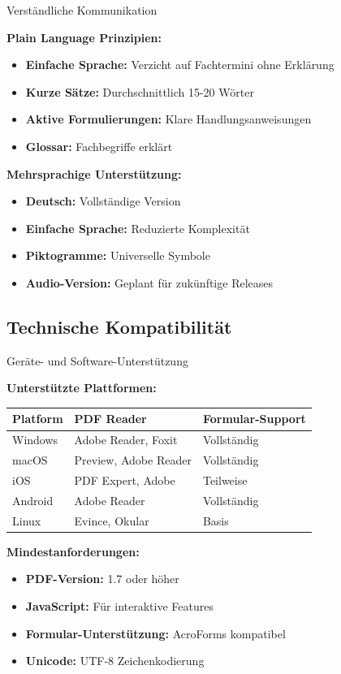 \begin{ctmmOrangeBox}{Verständliche Kommunikation}

\textbf{Plain Language Prinzipien:}
\begin{itemize}
  \item \textbf{Einfache Sprache:} Verzicht auf Fachtermini ohne Erklärung
  \item \textbf{Kurze Sätze:} Durchschnittlich 15-20 Wörter
  \item \textbf{Aktive Formulierungen:} Klare Handlungsanweisungen
  \item \textbf{Glossar:} Fachbegriffe erklärt
\end{itemize}

\textbf{Mehrsprachige Unterstützung:}
\begin{itemize}
  \item \textbf{Deutsch:} Vollständige Version
  \item \textbf{Einfache Sprache:} Reduzierte Komplexität
  \item \textbf{Piktogramme:} Universelle Symbole
  \item \textbf{Audio-Version:} Geplant für zukünftige Releases
\end{itemize}

\end{ctmmOrangeBox}

\subsection{Technische Kompatibilität}

\begin{ctmmPurpleBox}{Geräte- und Software-Unterstützung}

\textbf{Unterstützte Plattformen:}
\begin{tabular}{|l|l|l|}
\hline
\textbf{Platform} & \textbf{PDF Reader} & \textbf{Formular-Support} \\
\hline
Windows & Adobe Reader, Foxit & Vollständig \\
\hline
macOS & Preview, Adobe Reader & Vollständig \\
\hline
iOS & PDF Expert, Adobe & Teilweise \\
\hline
Android & Adobe Reader & Vollständig \\
\hline
Linux & Evince, Okular & Basis \\
\hline
\end{tabular}

\textbf{Mindestanforderungen:}
\begin{itemize}
  \item \textbf{PDF-Version:} 1.7 oder höher
  \item \textbf{JavaScript:} Für interaktive Features
  \item \textbf{Formular-Unterstützung:} AcroForms kompatibel
  \item \textbf{Unicode:} UTF-8 Zeichenkodierung
\end{itemize}

\end{ctmmPurpleBox}

